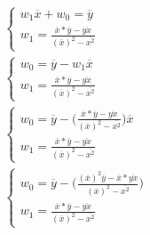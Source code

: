 \documentclass[10pt,a4paper]{article}
\newcommand*\mean[1]{\overline{#1}}
\begin{document}
	\begin{align*}
		\begin{cases}
			w_1\mean{x}+w_0=\mean{y}\\
			w_1=\frac{\mean{x}*\mean{y}-\mean{yx}}{(\mean{x})^2-\mean{x^2}}
		\end{cases}\\
		\begin{cases}
			w_0=\mean{y}-w_1\mean{x}\\
			w_1=\frac{\mean{x}*\mean{y}-\mean{yx}}{(\mean{x})^2-\mean{x^2}}
		\end{cases}\\
		\begin{cases}
			w_0=\mean{y}-\big(\frac{\mean{x}*\mean{y}-\mean{yx}}{(\mean{x})^2-\mean{x^2}}\big)\mean{x}\\
			w_1=\frac{\mean{x}*\mean{y}-\mean{yx}}{(\mean{x})^2-\mean{x^2}}
		\end{cases}\\
		\begin{cases}
			w_0=\mean{y}-\big(\frac{(\mean{x})^2\mean{y}-\mean{x}*\mean{yx}}{(\mean{x})^2-\mean{x^2}}\big)\\
			w_1=\frac{\mean{x}*\mean{y}-\mean{yx}}{(\mean{x})^2-\mean{x^2}}
		\end{cases}\\
	\end{align*}
	
\end{document}
